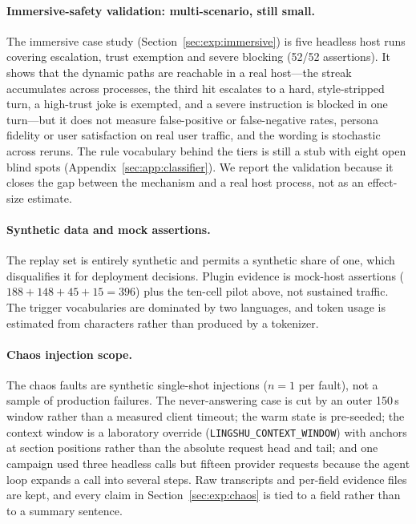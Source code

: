\paragraph{Immersive-safety validation: multi-scenario, still small.} The
immersive case study (Section~\ref{sec:exp:immersive}) is five headless host
runs covering escalation, trust exemption and severe blocking (52/52
assertions). It shows that the dynamic paths are reachable in a real host---the
streak accumulates across processes, the third hit escalates to a hard,
style-stripped turn, a high-trust joke is exempted, and a severe instruction is
blocked in one turn---but it does not measure false-positive or false-negative
rates, persona fidelity or user satisfaction on real user traffic, and the
wording is stochastic across reruns. The rule vocabulary behind the tiers is
still a stub with eight open blind spots (Appendix~\ref{sec:app:classifier}).
We report the validation because it closes the gap between the mechanism and a
real host process, not as an effect-size estimate.

\paragraph{Synthetic data and mock assertions.} The replay set is entirely
synthetic and permits a synthetic share of one, which disqualifies it for
deployment decisions. Plugin evidence is mock-host assertions
($188 + 148 + 45 + 15 = 396$) plus the ten-cell pilot above, not sustained
traffic. The trigger vocabularies are dominated by two languages, and token usage
is estimated from characters rather than produced by a tokenizer.

\paragraph{Chaos injection scope.} The chaos faults are synthetic single-shot
injections ($n=1$ per fault), not a sample of production failures. The
never-answering case is cut by an outer 150\,s window rather than a measured
client timeout; the warm state is pre-seeded; the context window is a laboratory
override (\texttt{LINGSHU\_\allowbreak{}CONTEXT\_\allowbreak{}WINDOW}) with anchors at section positions
rather than the absolute request head and tail; and one campaign used three
headless calls but fifteen provider requests because the agent loop expands a
call into several steps. Raw transcripts and per-field evidence files are kept,
and every claim in Section~\ref{sec:exp:chaos} is tied to a field rather than to a
summary sentence.

